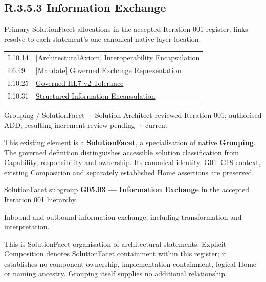 \subsection*{R.3.5.3 Information Exchange}
\label{navigation:R.3.5.3}

Primary SolutionFacet allocations in the accepted Iteration 001 register; links resolve to each statement’s one canonical native-layer location.\par
\begin{longtable}{p{.22\linewidth}p{.73\linewidth}}
I.10.14 & \hyperref[element:e9e0b4f82b6544e7ba87651c578d82c2]{[ArchitecturalAxiom] Interoperability Encapsulation} \\
I.6.49 & \hyperref[element:e9d06b3fe6b744cc86bd2a136e02165a]{[Mandate] Governed Exchange Representation} \\
I.10.25 & \hyperref[element:0968fc163ae54514bc1f02471fe6d866]{Governed HL7 v2 Tolerance} \\
I.10.31 & \hyperref[element:6973441f2d62448188af9bfce5ad9d9f]{Structured Information Encapsulation} \\
\end{longtable}
\label{element:bda335658c29473d9ba20352242c83f8}
{\small Grouping / SolutionFacet · Solution Architect-reviewed Iteration 001; authorised ADD; resulting increment review pending · current}\par

This existing element is a \textbf{SolutionFacet}, a specialisation of native
\textbf{Grouping}. The \href{\detokenize{../../../../../../../governance/continuum-representation.md#solutionfacet-classification--1119-candidate}}{governed definition}
distinguishes accessible solution classification from Capability, responsibility
and ownership. Its canonical identity, G01–G18 context, existing Composition
and separately established Home assertions are preserved.



SolutionFacet subgroup \textbf{G05.03 — Information Exchange} in the accepted Iteration 001 hierarchy.



Inbound and outbound information exchange, including transformation and interpretation.



This is SolutionFacet organisation of architectural statements. Explicit Composition denotes SolutionFacet containment within this register; it establishes no component ownership, implementation containment, logical Home or naming ancestry. Grouping itself supplies no additional relationship.


